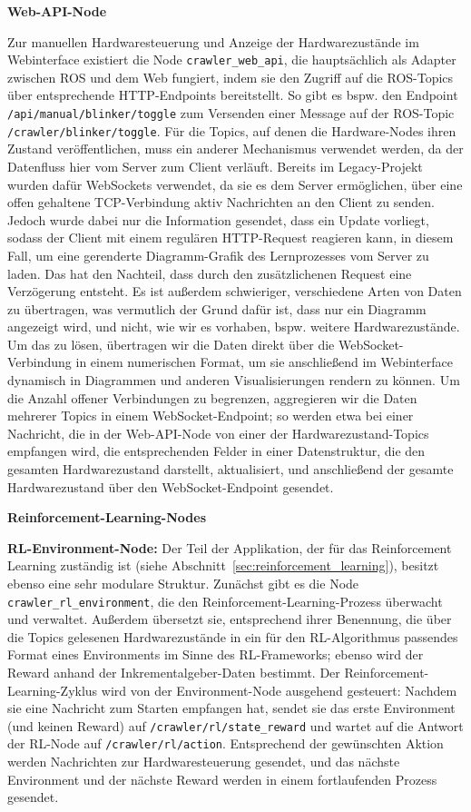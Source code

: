 \textbf{Web-API-Node}

Zur manuellen Hardwaresteuerung und Anzeige der Hardwarezustände im Webinterface existiert die Node \texttt{crawler\_web\_api}, die hauptsächlich als Adapter zwischen ROS und dem Web fungiert, indem sie den Zugriff auf die ROS-Topics über entsprechende HTTP-Endpoints bereitstellt. So gibt es bspw. den Endpoint \texttt{/api/manual/blinker/toggle} zum Versenden einer Message auf der ROS-Topic \texttt{/crawler/blinker/toggle}. Für die Topics, auf denen die Hardware-Nodes ihren Zustand veröffentlichen, muss ein anderer Mechanismus verwendet werden, da der Datenfluss hier vom Server zum Client verläuft. Bereits im Legacy-Projekt wurden dafür WebSockets verwendet, da sie es dem Server ermöglichen, über eine offen gehaltene TCP-Verbindung aktiv Nachrichten an den Client zu senden. Jedoch wurde dabei nur die Information gesendet, dass ein Update vorliegt, sodass der Client mit einem regulären HTTP-Request reagieren kann, in diesem Fall, um eine gerenderte Diagramm-Grafik des Lernprozesses vom Server zu laden. Das hat den Nachteil, dass durch den zusätzlichenen Request eine Verzögerung entsteht. Es ist außerdem schwieriger, verschiedene Arten von Daten zu übertragen, was vermutlich der Grund dafür ist, dass nur ein Diagramm angezeigt wird, und nicht, wie wir es vorhaben, bspw. weitere Hardwarezustände. Um das zu lösen, übertragen wir die Daten direkt über die WebSocket-Verbindung in einem numerischen Format, um sie anschließend im Webinterface dynamisch in Diagrammen und anderen Visualisierungen rendern zu können. Um die Anzahl offener Verbindungen zu begrenzen, aggregieren wir die Daten mehrerer Topics in einem WebSocket-Endpoint; so werden etwa bei einer Nachricht, die in der Web-API-Node von einer der Hardwarezustand-Topics empfangen wird, die entsprechenden Felder in einer Datenstruktur, die den gesamten Hardwarezustand darstellt, aktualisiert, und anschließend der gesamte Hardwarezustand über den WebSocket-Endpoint gesendet. 

\textbf{Reinforcement-Learning-Nodes}

\textbf{RL-Environment-Node:} Der Teil der Applikation, der für das Reinforcement Learning zuständig ist (siehe Abschnitt~\ref{sec:reinforcement_learning}), besitzt ebenso eine sehr modulare Struktur. Zunächst gibt es die Node \texttt{crawler\_rl\_environment}, die den Reinforcement-Learning-Prozess überwacht und verwaltet. Außerdem übersetzt sie, entsprechend ihrer Benennung, die über die Topics gelesenen Hardwarezustände in ein für den RL-Algorithmus passendes Format eines Environments im Sinne des RL-Frameworks; ebenso wird der Reward anhand der Inkrementalgeber-Daten bestimmt. Der Reinforcement-Learning-Zyklus wird von der Environment-Node ausgehend gesteuert: Nachdem sie eine Nachricht zum Starten empfangen hat, sendet sie das erste Environment (und keinen Reward) auf \texttt{/crawler/rl/state\_reward} und wartet auf die Antwort der RL-Node auf \texttt{/crawler/rl/action}. Entsprechend der gewünschten Aktion werden Nachrichten zur Hardwaresteuerung gesendet, und das nächste Environment und der nächste Reward werden in einem fortlaufenden Prozess gesendet.

